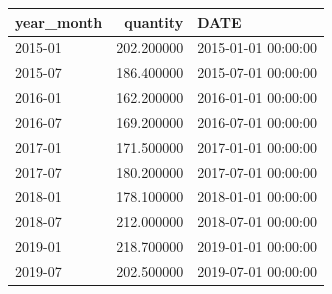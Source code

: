 \begin{tabular}{lrl}
\toprule
year_month & quantity & DATE \\
\midrule
2015-01 & 202.200000 & 2015-01-01 00:00:00 \\
2015-07 & 186.400000 & 2015-07-01 00:00:00 \\
2016-01 & 162.200000 & 2016-01-01 00:00:00 \\
2016-07 & 169.200000 & 2016-07-01 00:00:00 \\
2017-01 & 171.500000 & 2017-01-01 00:00:00 \\
2017-07 & 180.200000 & 2017-07-01 00:00:00 \\
2018-01 & 178.100000 & 2018-01-01 00:00:00 \\
2018-07 & 212.000000 & 2018-07-01 00:00:00 \\
2019-01 & 218.700000 & 2019-01-01 00:00:00 \\
2019-07 & 202.500000 & 2019-07-01 00:00:00 \\
\bottomrule
\end{tabular}
